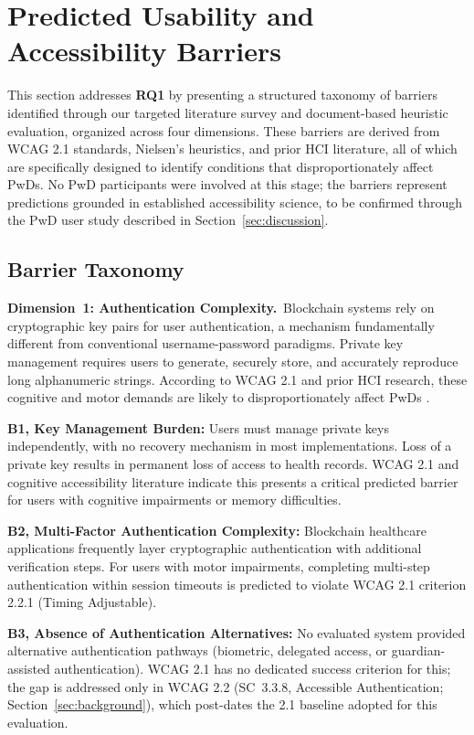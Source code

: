 \documentclass[journal,onecolumn]{IEEEtran}
\begin{document}
\section{Predicted Usability and Accessibility Barriers}
\label{sec:barriers}

This section addresses \textbf{RQ1} by presenting a structured taxonomy of barriers identified through our targeted literature survey and document-based heuristic evaluation, organized across four dimensions. These barriers are derived from WCAG 2.1 standards, Nielsen's heuristics, and prior HCI literature, all of which are specifically designed to identify conditions that disproportionately affect PwDs. No PwD participants were involved at this stage; the barriers represent predictions grounded in established accessibility science, to be confirmed through the PwD user study described in Section~\ref{sec:discussion}.

\subsection{Barrier Taxonomy}

\noindent\textbf{Dimension~1: Authentication Complexity.}\ Blockchain systems rely on cryptographic key pairs for user authentication, a mechanism fundamentally different from conventional username-password paradigms. Private key management requires users to generate, securely store, and accurately reproduce long alphanumeric strings. According to WCAG 2.1 and prior HCI research, these cognitive and motor demands are likely to disproportionately affect PwDs \cite{jang2020user}.

\textbf{B1, Key Management Burden:} Users must manage private keys independently, with no recovery mechanism in most implementations. Loss of a private key results in permanent loss of access to health records. WCAG 2.1 and cognitive accessibility literature indicate this presents a critical predicted barrier for users with cognitive impairments or memory difficulties.

\textbf{B2, Multi-Factor Authentication Complexity:} Blockchain healthcare applications frequently layer cryptographic authentication with additional verification steps. For users with motor impairments, completing multi-step authentication within session timeouts is predicted to violate WCAG 2.1 criterion 2.2.1 (Timing Adjustable).

\textbf{B3, Absence of Authentication Alternatives:} No evaluated system provided alternative authentication pathways (biometric, delegated access, or guardian-assisted authentication). WCAG 2.1 has no dedicated success criterion for this; the gap is addressed only in WCAG 2.2 (SC~3.3.8, Accessible Authentication; Section~\ref{sec:background}), which post-dates the 2.1 baseline adopted for this evaluation.
\end{document}
